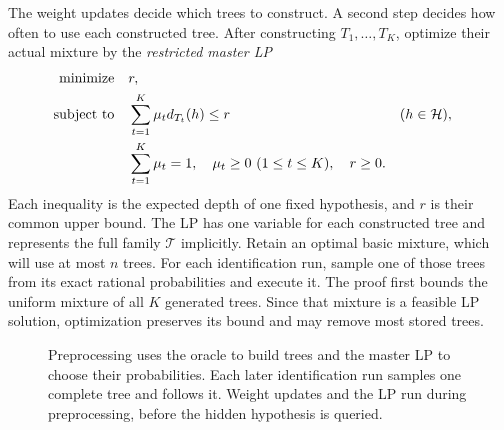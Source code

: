 The weight updates decide which trees to construct. A second step
decides how often to use each constructed tree. After constructing
$T_1,\ldots,T_K$, optimize their actual mixture by the
\emph{restricted master LP}
\begin{equation}\label{eq:randomized-master-lp}
 \begin{aligned}
  \text{minimize}\quad&r,\\
  \text{subject to}\quad&
       \sum_{t=1}^K\mu_t d_{T_t}(h)\le r
             &&(h\in\mathcal H),\\
   &\sum_{t=1}^K\mu_t=1,\quad
     \mu_t\ge0\ (1\le t\le K),\quad r\ge0.
 \end{aligned}
\end{equation}
Each inequality is the expected depth of one fixed hypothesis, and $r$
is their common upper bound. The LP has one variable for each
constructed tree and represents the full family $\mathcal T$
implicitly.
Retain an optimal basic mixture, which will use at most $n$ trees.
For each identification run, sample one of those trees from its exact
rational probabilities and execute it. The proof first bounds the
uniform mixture of all $K$ generated trees. Since that mixture is a
feasible LP solution, optimization preserves its bound and may remove
most stored trees.



\begin{figure}[htbp]
\centering
{}
\caption{Preprocessing uses the oracle to build trees and the master LP
to choose their probabilities. Each later identification run samples
one complete tree and follows it. Weight updates and the LP run during
preprocessing, before the hidden hypothesis is queried.}
\label{fig:randomized-flow}
\end{figure}

